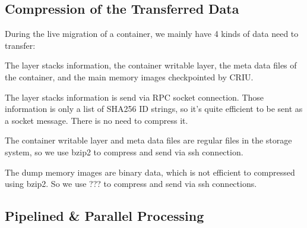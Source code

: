 \subsection{Compression of the Transferred Data}\label{design:compression}

During the live migration of a container, we mainly have 4 kinds of data need to transfer:

The layer stacks information, the container writable layer, the meta data files of the container, and the main memory images checkpointed by CRIU. 


The layer stacks information is send via RPC socket connection. Those information is only a list of SHA256 ID strings, so it's quite efficient to be sent as a socket message. There is no need to compress it.

The container writable layer and meta data files are regular files in the storage system, so we use bzip2  to compress and send via ssh connection.

The dump memory images are binary data, which is not efficient to compressed using bzip2. So we use ??? to compress and send via ssh connections.

\subsection{Pipelined \& Parallel Processing}\label{design:pipe}









